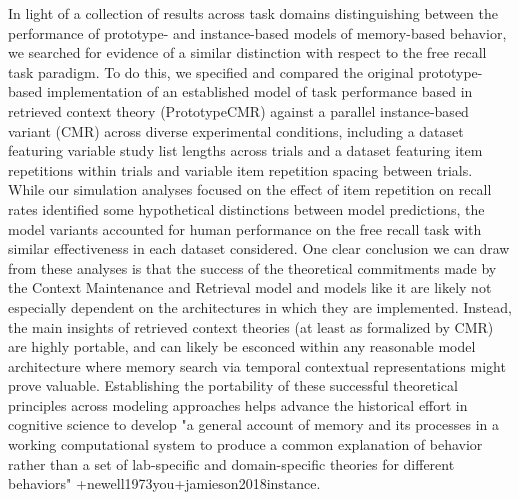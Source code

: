 \markdownRendererInterblockSeparator
{}In light of a collection of results across task domains distinguishing between the performance of prototype- and instance-based models of memory-based behavior, we searched for evidence of a similar distinction with respect to the free recall task paradigm. To do this, we specified and compared the original prototype-based implementation of an established model of task performance based in retrieved context theory (PrototypeCMR) against a parallel instance-based variant (CMR) across diverse experimental conditions, including a dataset featuring variable study list lengths across trials and a dataset featuring item repetitions within trials and variable item repetition spacing between trials. While our simulation analyses focused on the effect of item repetition on recall rates identified some hypothetical distinctions between model predictions, the model variants accounted for human performance on the free recall task with similar effectiveness in each dataset considered.\markdownRendererInterblockSeparator
{}One clear conclusion we can draw from these analyses is that the success of the theoretical commitments made by the Context Maintenance and Retrieval model and models like it are likely not especially dependent on the architectures in which they are implemented. Instead, the main insights of retrieved context theories (at least as formalized by CMR) are highly portable, and can likely be esconced within any reasonable model architecture where memory search via temporal contextual representations might prove valuable. Establishing the portability of these successful theoretical principles across modeling approaches helps advance the historical effort in cognitive science to develop "a general account of memory and its processes in a working computational system to produce a common explanation of behavior rather than a set of lab-specific and domain-specific theories for different behaviors" +{}{}{newell1973you}+{}{}{jamieson2018instance}.\markdownRendererInterblockSeparator
